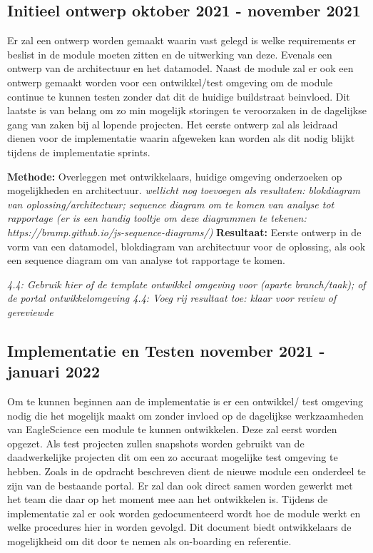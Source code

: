 \subsection{Initieel ontwerp \textbf{oktober 2021 - november 2021 }}\label{sec:initieel-ontwerp}
Er zal een ontwerp worden gemaakt waarin vast gelegd is welke requirements er beslist in de module moeten zitten en de uitwerking van deze. Evenals een ontwerp van de architectuur en het datamodel. Naast de module zal er ook een ontwerp gemaakt worden voor een ontwikkel/test omgeving om de module continue te kunnen testen zonder dat dit de huidige buildstraat beinvloed. Dit laatste is van belang om zo min mogelijk storingen te veroorzaken in de dagelijkse gang van zaken bij al lopende projecten. Het eerste ontwerp zal als leidraad dienen voor de implementatie waarin afgeweken kan worden als dit nodig blijkt tijdens de implementatie sprints.

\textbf{Methode:} Overleggen met ontwikkelaars, huidige omgeving onderzoeken op mogelijkheden en architectuur.
\textit{wellicht nog toevoegen als resultaten: blokdiagram van oplossing/architectuur; sequence diagram om te komen van analyse tot rapportage (er is een handig tooltje om deze diagrammen te tekenen: https://bramp.github.io/js-sequence-diagrams/)}
\textbf{Resultaat:} Eerste ontwerp in de vorm van een datamodel, blokdiagram van architectuur voor de oplossing, als ook een sequence diagram om van analyse tot rapportage te komen.

\textit{4.4: Gebruik hier of de template ontwikkel omgeving voor (aparte branch/taak); of de portal ontwikkelomgeving
4.4: Voeg rij resultaat toe: klaar voor review of gereviewde}

\subsection{Implementatie en Testen \textbf{november 2021 - januari 2022 }}\label{sec:implementatie-en-testen}
Om te kunnen beginnen aan de implementatie is er een ontwikkel/ test omgeving nodig die het mogelijk maakt om zonder invloed op de dagelijkse werkzaamheden van EagleScience een module te kunnen ontwikkelen. Deze zal eerst worden opgezet. Als test projecten zullen snapshots worden gebruikt van de daadwerkelijke projecten dit om een zo accuraat mogelijke test omgeving te hebben. Zoals in de opdracht beschreven dient de nieuwe module een onderdeel te zijn van de bestaande portal. Er zal dan ook direct samen worden gewerkt met het team die daar op het moment mee aan het ontwikkelen is. Tijdens de implementatie zal er ook worden gedocumenteerd wordt hoe de module werkt en welke procedures hier in worden gevolgd. Dit document biedt ontwikkelaars de mogelijkheid om dit door te nemen als on-boarding en referentie.

